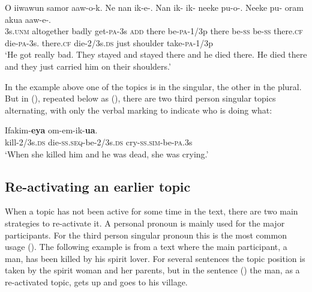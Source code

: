 \ea%
\label{ex:x1676}
\gll O  iiwawun  samor  aaw-o-k.  Ne  nan  ik-e-. Nan  ik-  ik-  neeke  pu-o-.  Neeke  pu-  oram akua  aaw-e-.\\
3s.\textsc{unm}  altogether  badly  get-\textsc{pa}-3s  \textsc{add}  there  be-\textsc{pa}-1/3p there  be-\textsc{ss}  be-\textsc{ss}  there.\textsc{cf}  die-\textsc{pa}-3s.  there.\textsc{cf}  die-2/3s.\textsc{ds}  just shoulder  take-\textsc{pa}-1/3p    \\
\glt`He got really bad. They stayed and stayed there and he died there. He died there and they just carried him on their shoulders.'
\z


In the example above one of the topics is in the singular, the other in the plural. But in (), repeated below as (), there are two third person singular topics alternating, with only the verbal marking to indicate who is doing what:

\ea%
\label{ex:x1920}
\gll Ifakim-\textbf{eya}   om-em-ik-\textbf{ua}. \\
kill-2/3s.\textsc{ds}  die-\textsc{ss}.\textsc{seq}-be-2/3s.\textsc{ds}  cry-\textsc{ss}.\textsc{sim}-be-\textsc{pa}.3s     \\
\glt`When she killed him and he was dead, she was crying.'
\z


\subsection{Re-activating an earlier topic}

When a topic has not been active for some time in the text, there are two main strategies to re-activate it. A personal pronoun is mainly used for the major participants. For the third person singular pronoun this is the most common usage (). The following example is from a text where the main participant, a man, has been killed by his spirit lover. For several sentences the topic position is taken by the spirit woman and her parents, but in the sentence () the man, as a re-activated topic, gets up and goes to his village.

